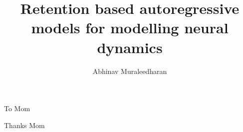 \documentclass{ut-thesis}
\author{Abhinav Muraleedharan}
\title{Retention based autoregressive models for modelling neural dynamics}
\begin{document}
  \frontmatter
    \maketitle
    \begin{abstract}
      
    \end{abstract}
    \begin{dedication}
      To Mom
    \end{dedication}
    \begin{acknowledgements}
      Thanks Mom
    \end{acknowledgements}
    \tableofcontents
    \listoftables
    \listoffigures
  \mainmatter
    
    
    
  \appendix
    
  \backmatter
  \printbibliography[heading=bibintoc]
  \lipsum[1-6]
\end{document}
